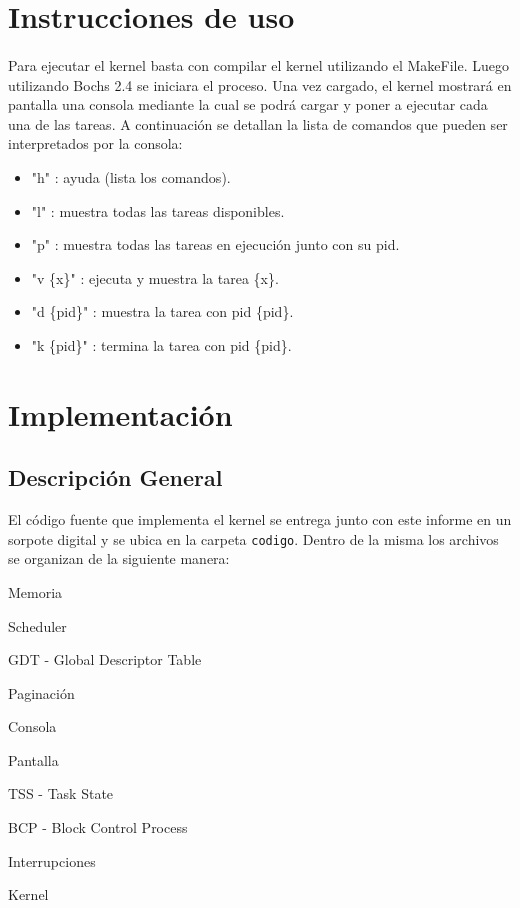 \documentclass[11pt, a4paper]{article}
\begin{document}
\section{Instrucciones de uso}
\paragraph{}
Para ejecutar el kernel basta con compilar el kernel utilizando el MakeFile. Luego utilizando Bochs 2.4 se iniciara el proceso. Una vez cargado, el kernel mostrará en pantalla una consola mediante la cual se podrá cargar y poner a ejecutar cada una de las tareas. A continuación se detallan la lista de comandos que pueden ser interpretados por la consola:
\begin{itemize}
\item "h" : ayuda (lista los comandos).
\item "l" : muestra todas las tareas disponibles.
\item "p" : muestra todas las tareas en ejecuci\'on junto con su pid.
\item "v \{x\}" : ejecuta y muestra la tarea \{x\}.
\item "d \{pid\}" : muestra la tarea con pid \{pid\}.
\item "k \{pid\}" : termina la tarea con pid \{pid\}.

\end{itemize}


\section{Implementación}
\subsection{Descripción General}
El código fuente que implementa el kernel se entrega junto con este informe en un sorpote digital y se ubica en la carpeta \texttt{codigo}. Dentro de la misma los archivos se organizan de la siguiente manera:
\begin{center}
\begin{shortitemize}
\setlength{\shortitemwidth}{200pt}
\item Memoria
\item Scheduler
\item GDT - Global Descriptor Table
\item Paginación				
\item Consola
\item Pantalla
\item TSS - Task State
\item BCP - Block Control Process
\item Interrupciones							
\item Kernel
\end{shortitemize}
\end{center}		
\end{document}
